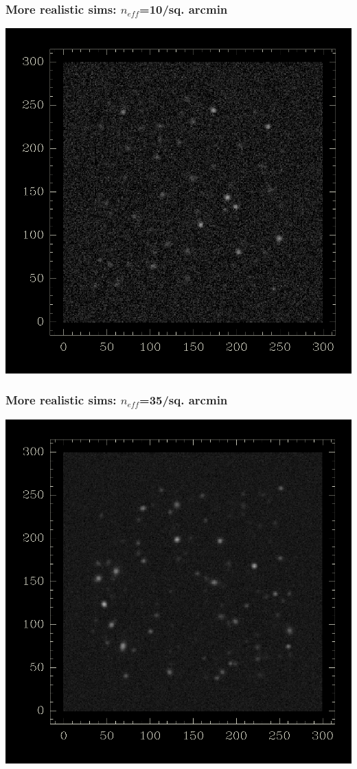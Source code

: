 \documentclass{beamer}
\newcommand{\neff}{$n_{eff}$}
\begin{document}
\begin{frame}
    \frametitle{More realistic sims: \neff=10/sq. arcmin}
 
    \begin{center}
        \includegraphics[height=0.8\textheight]{10persqarcmin.png}
    \end{center}
\end{frame}

\begin{frame}
    \frametitle{More realistic sims: \neff=35/sq. arcmin}
 
    \begin{center}
        \includegraphics[height=0.8\textheight]{35persqarcmin.png}
    \end{center}

\end{frame}
\end{document}
